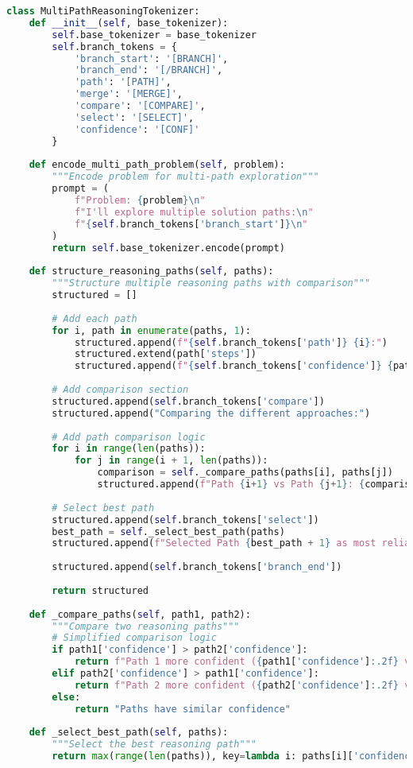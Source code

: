 \begin{lstlisting}[language=Python, caption=Multi-path reasoning with branch tokens]
class MultiPathReasoningTokenizer:
    def __init__(self, base_tokenizer):
        self.base_tokenizer = base_tokenizer
        self.branch_tokens = {
            'branch_start': '[BRANCH]',
            'branch_end': '[/BRANCH]',
            'path': '[PATH]',
            'merge': '[MERGE]',
            'compare': '[COMPARE]',
            'select': '[SELECT]',
            'confidence': '[CONF]'
        }
        
    def encode_multi_path_problem(self, problem):
        """Encode problem for multi-path exploration"""
        prompt = (
            f"Problem: {problem}\n"
            f"I'll explore multiple solution paths:\n"
            f"{self.branch_tokens['branch_start']}\n"
        )
        return self.base_tokenizer.encode(prompt)
    
    def structure_reasoning_paths(self, paths):
        """Structure multiple reasoning paths with comparison"""
        structured = []
        
        # Add each path
        for i, path in enumerate(paths, 1):
            structured.append(f"{self.branch_tokens['path']} {i}:")
            structured.extend(path['steps'])
            structured.append(f"{self.branch_tokens['confidence']} {path['confidence']}")
        
        # Add comparison section
        structured.append(self.branch_tokens['compare'])
        structured.append("Comparing the different approaches:")
        
        # Add path comparison logic
        for i in range(len(paths)):
            for j in range(i + 1, len(paths)):
                comparison = self._compare_paths(paths[i], paths[j])
                structured.append(f"Path {i+1} vs Path {j+1}: {comparison}")
        
        # Select best path
        structured.append(self.branch_tokens['select'])
        best_path = self._select_best_path(paths)
        structured.append(f"Selected Path {best_path + 1} as most reliable")
        
        structured.append(self.branch_tokens['branch_end'])
        
        return structured
    
    def _compare_paths(self, path1, path2):
        """Compare two reasoning paths"""
        # Simplified comparison logic
        if path1['confidence'] > path2['confidence']:
            return f"Path 1 more confident ({path1['confidence']:.2f} vs {path2['confidence']:.2f})"
        elif path2['confidence'] > path1['confidence']:
            return f"Path 2 more confident ({path2['confidence']:.2f} vs {path1['confidence']:.2f})"
        else:
            return "Paths have similar confidence"
    
    def _select_best_path(self, paths):
        """Select the best reasoning path"""
        return max(range(len(paths)), key=lambda i: paths[i]['confidence'])
\end{lstlisting}

